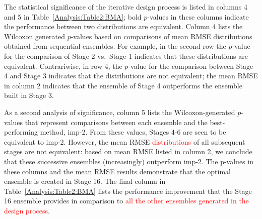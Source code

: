 \documentclass[journal=jpcbfk, manuscript=article]{achemso}
\newcommand{\+}[1]{\ensuremath{\mathbf{#1}}}
\newcommand{\rev}[1]{\textsf{\textcolor{red}{#1}}}
\begin{document}
The statistical significance of the iterative design process is listed in columns 4 and 5 in Table~\ref{Analysis:Table2:BMA}; bold $p$-values in these columns indicate the performance between two distributions are equivalent.
Column 4 lists the Wilcoxon generated $p$-values based on comparisons of mean RMSE distributions obtained from sequential ensembles.
For example, in the second row the $p$-value for the comparison of Stage 2 vs.~Stage 1 indicates that these distributions are equivalent.
Contrariwise, in row 4, the $p$-value for the comparison between Stage 4 and Stage 3 indicates that the distributions are not equivalent; the mean RMSE in column 2 indicates that the ensemble of Stage 4 outperforms the ensemble built in Stage 3.

As a second analysis of significance, column 5 lists the Wilcoxon-generated $p$-values that represent comparisons between each ensemble and the best-performing method, imp-2.
From these values, Stages 4-6 are seen to be equivalent to imp-2.
However, the mean RMSE \rev{distributions} of all subsequent stages are not equivalent: based on mean RMSE listed in column 2, we conclude that these successive ensembles (increasingly) outperform imp-2.
The p-values in these columns and the mean RMSE results demonstrate that the optimal ensemble is created in Stage 16.
The final column in Table~\ref{Analysis:Table2:BMA} lists the performance improvement that the Stage 16 ensemble provides in comparison to \rev{all the other ensembles generated in the design process}.
\end{document}
